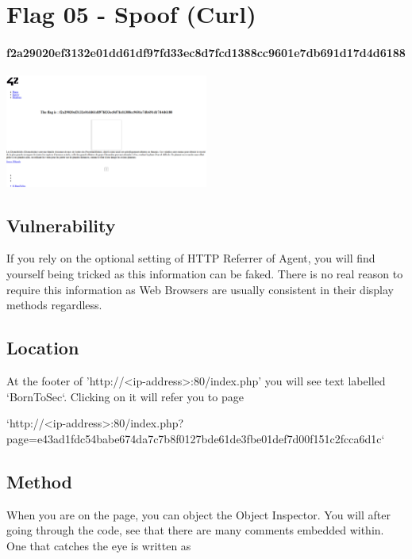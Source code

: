 \section{Flag 05 - Spoof (Curl)}

\paragraph{f2a29020ef3132e01dd61df97fd33ec8d7fcd1388cc9601e7db691d17d4d6188}
\begin{center}
    \includegraphics[width=0.5\textwidth]{08.Flag05/05-04.png}\\[0cm] 
\end{center}

\subsection{Vulnerability}

If you rely on the optional setting of HTTP Referrer of Agent, you will find yourself being tricked as this information can be faked. There is no real reason to require this information as Web Browsers are usually consistent in their display methods regardless.

\subsection{Location}

At the footer of 'http://<ip-address>:80/index.php' you will see text labelled `BornToSec`. Clicking on it will refer you to page

`http://<ip-address>:80/index.php?page=e43ad1fdc54babe674da7c7b8f0127bde61de3fbe01def7d00f151c2fcca6d1c`

\subsection{Method}

When you are on the page, you can object the Object Inspector. You will after going through the code, see that there are many comments embedded within. One that catches the eye is written as

